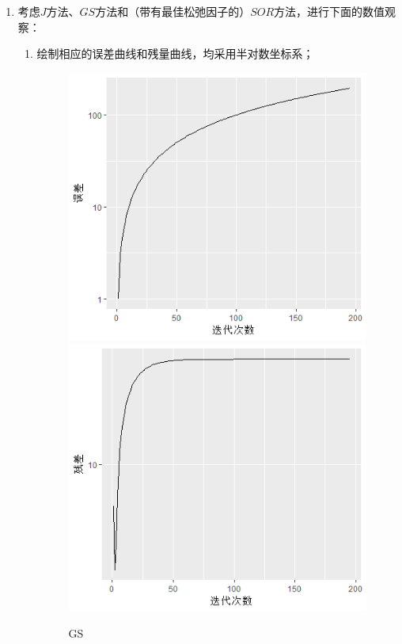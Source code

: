 \documentclass[10pt]{article}
\begin{document}
\begin{enumerate}
  \item  考虑$J$方法、$GS$方法和（带有最佳松弛因子的）$SOR$方法，进行下面的数值观察：\begin{enumerate}
  \item 绘制相应的误差曲线和残量曲线，均采用半对数坐标系；
  \begin{figure}[H]
  \centering
  \includegraphics[width=.9\textwidth]{3-G1.png}
  \includegraphics[width=.9\textwidth]{3-G2.png}
  \caption{GS}
  \end{figure}
  \begin{figure}[H]
  \centering

\end{figure}
\end{enumerate}
\end{enumerate}
\end{document}

